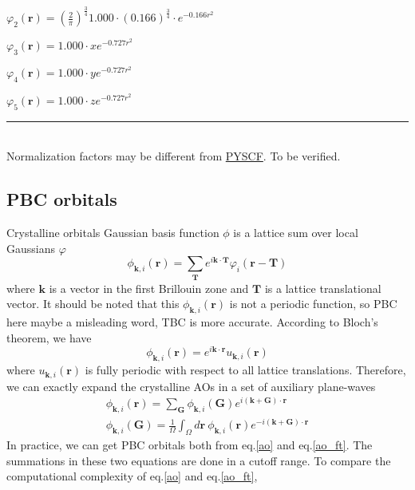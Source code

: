 \documentclass{article}
\begin{document}
        $ \varphi_2(\textbf{r}) = \left(\frac{2}{\pi}\right)^{\frac{3}{4}}
            1.000\cdot(0.166)^{\frac{3}{4}}\cdot e^{-0.166r^2} $

        $ \varphi_3(\textbf{r}) = 1.000\cdot x e^{-0.727r^2} $

        $ \varphi_4(\textbf{r}) = 1.000\cdot y e^{-0.727r^2} $

        $ \varphi_5(\textbf{r}) = 1.000\cdot z e^{-0.727r^2} $
        \hrule
        ~\\
        Normalization factors may be different from \href{https://pyscf.org/}{PYSCF}. To be verified.
        
    \subsection{PBC orbitals}
    Crystalline orbitals Gaussian basis function $\phi$ is a lattice sum over local Gaussians $\varphi$
    \begin{equation}
        \phi_{\textbf{k},i}(\textbf{r}) = \sum_{\textbf{T}}e^{i\textbf{k}\cdot\textbf{T}}\varphi_i(\textbf{r}-\textbf{T})\label{ao}
    \end{equation}
    where $\textbf{k}$ is a vector in the first Brillouin zone and $\textbf{T}$ is a lattice translational vector.
    It should be noted that this $\phi_{\textbf{k},i}(\textbf{r})$ is not a periodic function, 
    so PBC here maybe a misleading word, TBC is more accurate.
    According to Bloch's theorem, we have
    \begin{equation}
        \phi_{\textbf{k},i}(\textbf{r}) = e^{i\textbf{k}\cdot\textbf{r}}u_{\textbf{k},i}(\textbf{r})
    \end{equation}
    where $u_{\textbf{k},i}(\textbf{r})$ is fully periodic with respect to all lattice translations.
    Therefore, we can exactly expand the crystalline AOs in a set of auxiliary plane-waves
    \begin{gather}
        \phi_{\textbf{k},i}(\textbf{r}) = \sum_{\textbf{G}}\phi_{\textbf{k},i}(\textbf{G})e^{i(\textbf{k}+\textbf{G})\cdot\textbf{r}}\label{ao_ft}\\
        \phi_{\textbf{k},i}(\textbf{G}) = \frac{1}{\Omega}\int_\Omega d\textbf{r}\ \phi_{\textbf{k},i}(\textbf{r})e^{-i(\textbf{k}+\textbf{G})\cdot\textbf{r}}\label{ao_ft_coeff}
    \end{gather}
    In practice, we can get PBC orbitals both from eq.\eqref{ao} and eq.\eqref{ao_ft}. 
    The summations in these two equations are done in a cutoff range.
    To compare the computational complexity of eq.\eqref{ao} and eq.\eqref{ao_ft}, 
\end{document}
